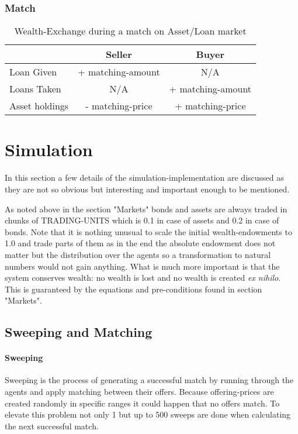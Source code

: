 \documentclass[Bachelorarbeit.tex]{subfiles}
\begin{document}
\subsubsection{Match}

\begin{table}[H]
	\centering
	\caption{Wealth-Exchange during a match on Asset/Loan market}
	\begin{tabular} { l c c }
		& Seller & Buyer \\
		\hline
		Loan Given & + matching-amount & N/A \\
		Loans Taken & N/A & + matching-amount \\
		Asset holdings & - matching-price & + matching-price \\
		\hline
	\end{tabular}
\end{table}

\section{Simulation}
In this section a few details of the simulation-implementation are discussed as they are not so obvious but interesting and important enough to be mentioned.

\medskip

As noted above in the section "Markets" bonds and assets are always traded in chunks of TRADING-UNITS which is 0.1 in case of assets and 0.2 in case of bonds. Note that it is nothing unusual to scale the initial wealth-endowments to 1.0 and trade parts of them as in the end the absolute endowment does not matter but the distribution over the agents so a transformation to natural numbers would not gain anything. What is much more important is that the system conserves wealth: no wealth is lost and no wealth is created \textit{ex nihilo}. This is guaranteed by the equations and pre-conditions found in section "Markets". 

\subsection{Sweeping and Matching}
\label{sec:implementation_sweepingAndMatching}

\paragraph{Sweeping}
Sweeping is the process of generating a successful match by running through the agents and apply matching between their offers. Because offering-prices are created randomly in specific ranges it could happen that no offers match. To elevate this problem not only 1 but up to 500 sweeps are done when calculating the next successful match.
\end{document}
